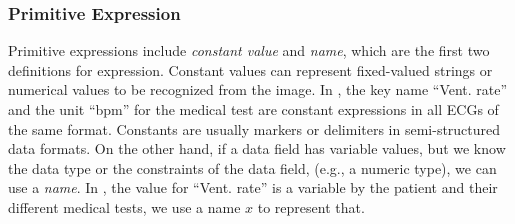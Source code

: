 \subsubsection{Primitive Expression}
Primitive expressions include \textit{constant value} and \textit{name},
which are the first two definitions for expression.
Constant values can represent fixed-valued strings or numerical values
to be recognized from the image.
In , the key name ``Vent. rate'' and the unit
``bpm'' for the medical test are constant expressions in all ECGs of the same
format. Constants are usually markers or delimiters in semi-structured
data formats.
On the other hand, if a data field has variable values,
but we know the data type or the constraints of the data field,
(e.g., a numeric type), we can use a \textit{name}.
In , the value for ``Vent. rate'' is a variable by
the patient and their different medical tests, we use a name $x$ to represent that.


